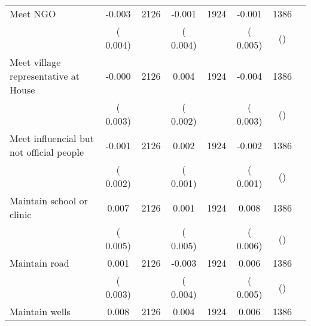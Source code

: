 \begin{tabular}{l*{6}{c}}
Meet NGO        &             -0.003      &       2126       &             -0.001      &       1924       &             -0.001      &       1386  &  &              \\
                       &       (       0.004)            &                               &       (       0.004)            &                               &       (       0.005)            &       () &                  \\
Meet village representative at House        &             -0.000      &       2126       &              0.004      &       1924       &             -0.004      &       1386  &  &              \\
                       &       (       0.003)            &                               &       (       0.002)            &                               &       (       0.003)            &       () &                  \\
Meet influencial but not official people        &             -0.001      &       2126       &              0.002      &       1924       &             -0.002      &       1386  &  &              \\
                       &       (       0.002)            &                               &       (       0.001)            &                               &       (       0.001)            &       () &                  \\
Maintain school or clinic        &              0.007      &       2126       &              0.001      &       1924       &              0.008      &       1386  &  &              \\
                       &       (       0.005)            &                               &       (       0.005)            &                               &       (       0.006)            &       () &                  \\
Maintain road        &              0.001      &       2126       &             -0.003      &       1924       &              0.006      &       1386  &  &              \\
                       &       (       0.003)            &                               &       (       0.004)            &                               &       (       0.005)            &       () &                  \\
Maintain wells        &              0.008      &       2126       &              0.004      &       1924       &              0.006      &       1386  &  &              \\

\end{tabular}
